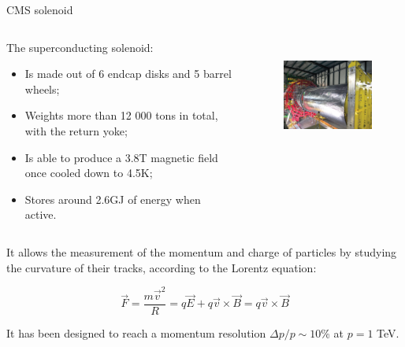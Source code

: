 \documentclass[8pt]{beamer}
\begin{document}
\begin{frame}{CMS solenoid}
\justifying
\begin{columns}
	\begin{column}{0.46 \textwidth}
	\justifying
The superconducting solenoid:
\begin{itemize}
\justifying
\item Is made out of 6 endcap disks and 5 barrel wheels;
\item Weights more than 12 000 tons in total, with the return yoke;
\item Is able to produce a 3.8T magnetic field once cooled down to 4.5K;
\item Stores around 2.6GJ of energy when active.
\end{itemize}
\end{column}
	\begin{column}{0.51 \textwidth}
\begin{figure}[htbp]
\begin{center}
\includegraphics[width=5.5cm, height=3.7cm]{figs/CMSMagnet.jpg}
\end{center}
\end{figure}
	\end{column}
	\end{columns} \vfill

It allows the measurement of the momentum and charge of particles by studying the curvature of their tracks, according to the Lorentz equation:

\begin{equation*}
\overrightarrow{F} = \frac{m \overrightarrow{v}^2}{R} =  q \overrightarrow{E} + q \overrightarrow{v} \times \overrightarrow{B} = q \overrightarrow{v} \times \overrightarrow{B}
\end{equation*}
\vfill

It has been designed to reach a momentum resolution $\Delta p/p \sim 10$\% at $p = 1$ TeV. \vfill
\end{frame}
\end{document}
